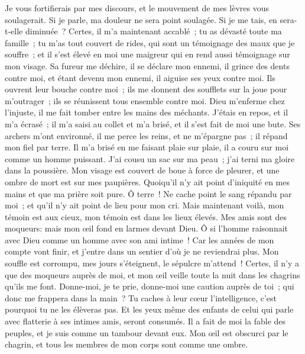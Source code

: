 \begin{multicols}{2}
Je vous fortifierais par mes discours, et le mouvement de mes lèvres vous soulagerait.
Si je parle, ma douleur ne sera point soulagée. Si je me tais, en sera-t-elle diminuée~?
Certes, il m'a maintenant accablé~; tu as dévasté toute ma famille~; 
tu m'as tout couvert de rides, qui sont un témoignage des maux que je souffre~; et il s'est élevé en moi une maigreur qui en rend aussi témoignage sur mon visage. 
Sa fureur me déchire, il se déclare mon ennemi, il grince des dents contre moi, et étant devenu mon ennemi, il aiguise ses yeux contre moi.
Ils ouvrent leur bouche contre moi~; ils me donnent des soufflets sur la joue pour m'outrager~; ils se réunissent tous ensemble contre moi. 
Dieu m'enferme chez l'injuste, il me fait tomber entre les mains des méchants. 
J'étais en repos, et il m'a écrasé~; il m'a saisi au collet et m'a brisé, et il s'est fait de moi une bute.
Ses archers m'ont environné, il me perce les reins, et ne m'épargne pas~; il répand mon fiel par terre. 
Il m'a brisé en me faisant plaie sur plaie, il a couru sur moi comme un homme puissant.
J'ai cousu un sac sur ma peau~; j'ai terni ma gloire dans la poussière.
Mon visage est couvert de boue à force de pleurer, et une ombre de mort est sur mes paupières. 
Quoiqu'il n'y ait point d'iniquité en mes mains et que ma prière soit pure.
Ô terre~! Ne cache point le sang répandu par moi~; et qu'il n'y ait point de lieu pour mon cri.
Mais maintenant voilà, mon témoin est aux cieux, mon témoin est dans les lieux élevés.
Mes amis sont des moqueurs: mais mon œil fond en larmes devant Dieu.
Ô si l'homme raisonnait avec Dieu comme un homme avec son ami intime~! 
Car les années de mon compte vont finir, et j'entre dans un sentier d'où je ne reviendrai plus. 
\VerseOne{}Mon souffle est corrompu, mes jours s'éteignent, le sépulcre m'attend~!
Certes, il n'y a que des moqueurs auprès de moi, et mon œil veille toute la nuit dans les chagrins qu'ils me font.
Donne-moi, je te prie, donne-moi une caution auprès de toi~; qui donc me frappera dans la main~?
Tu caches à leur cœur l'intelligence, c'est pourquoi tu ne les élèveras pas.
Et les yeux même des enfants de celui qui parle avec flatterie à ses intimes amis, seront consumés.
Il a fait de moi la fable des peuples, et je suis comme un tambour devant eux.
Mon œil est obscurci par le chagrin, et tous les membres de mon corps sont comme une ombre.

\end{multicols}

